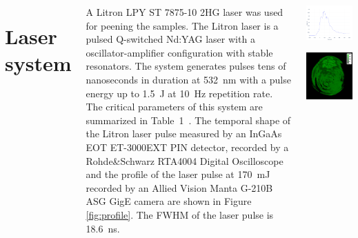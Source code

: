\documentclass[20pt,margin=1in,innermargin=-4.5in,blockverticalspace=-0.25in]{tikzposter}
\begin{document}
\begin{columns}
{    \section*{Laser system}
    A Litron LPY ST 7875-10 2HG laser was used for peening the samples. The Litron laser is a pulsed Q-switched Nd:YAG laser with a oscillator-amplifier configuration with stable resonators. The system generates pulses tens of nanoseconds in duration at \SI{532}{\nano\meter} with a pulse energy up to \SI{1.5}{\joule} at \SI{10}{\hertz} repetition rate. The critical parameters of this system are summarized in Table~1~\cite{litron}. The temporal shape of the Litron laser pulse measured by an InGaAs EOT ET-3000EXT PIN detector, recorded by a Rohde\&Schwarz RTA4004 Digital Oscilloscope and the profile of the laser pulse at \SI{170}{\milli\joule} recorded by an Allied Vision Manta G-210B ASG GigE camera are shown in Figure \ref{fig:profile}. 
    The FWHM of the laser pulse is \SI{18.6}{\ns}.



        \begin{center}
        \begin{tikzfigure} 
        \begin{minipage}{.4\textwidth}
        \includegraphics[width=0.45\linewidth,valign=c]{img/Litron_temporal_plotly.png}
        \label{fig:profile}
        \end{minipage}%
        \begin{minipage}{.4\textwidth}
        \includegraphics[width=0.45\linewidth,valign=c]{img/C2-v3_36_mJ_scale.png}
        \label{fig:profile}
        \end{minipage}%
        \end{tikzfigure}
        \end{center}


}
\end{columns}
\end{document}
